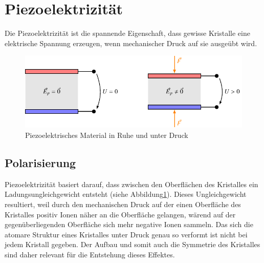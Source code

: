 \section{Piezoelektrizität}
Die Piezoelektrizität ist die spannende Eigenschaft, dass gewisse Kristalle eine elektrische Spannung erzeugen, wenn mechanischer Druck auf sie ausgeübt wird.

\begin{figure}
    \centering
    \includegraphics[]{papers/punktgruppen/figures/piezo} %
    \caption{Piezoelektrisches Material in Ruhe und unter Druck}
    \label{fig:punktgruppen:basicPiezo}
\end{figure}

\subsection{Polarisierung}
Piezoelektrizität basiert darauf, dass zwischen den Oberflächen des Kristalles ein Ladungsungleichgewicht entsteht (siehe Abbildung\ref{fig:punktgruppen:basicPiezo}).
Dieses Ungleichgewicht resultiert, 
weil durch den mechanischen Druck auf der einen Oberfläche des Kristalles positiv Ionen näher an die Oberfläche gelangen,
wärend auf der gegenüberliegenden Oberfläche sich mehr negative Ionen sammeln.
Das sich die atomare Struktur eines Kristalles unter Druck genau so verformt ist nicht bei jedem Kristall gegeben.
Der Aufbau und somit auch die Symmetrie des Kristalles sind daher relevant für die Entstehung dieses Effektes.

